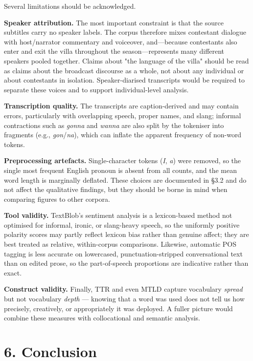 \documentclass[11pt]{article}
\begin{document}
Several limitations should be acknowledged.

\textbf{Speaker attribution.} The most important constraint is that the source subtitles carry no speaker labels. The corpus therefore mixes contestant dialogue with host/narrator commentary and voiceover, and---because contestants also enter and exit the villa throughout the season---represents many different speakers pooled together. Claims about "the language of the villa" should be read as claims about the broadcast discourse as a whole, not about any individual or about contestants in isolation. Speaker-diarised transcripts would be required to separate these voices and to support individual-level analysis.

\textbf{Transcription quality.} The transcripts are caption-derived and may contain errors, particularly with overlapping speech, proper names, and slang; informal contractions such as \emph{gonna} and \emph{wanna} are also split by the tokeniser into fragments (e.g., \emph{gon}/\emph{na}), which can inflate the apparent frequency of non-word tokens.

\textbf{Preprocessing artefacts.} Single-character tokens (\emph{I}, \emph{a}) were removed, so the single most frequent English pronoun is absent from all counts, and the mean word length is marginally deflated. These choices are documented in §3.2 and do not affect the qualitative findings, but they should be borne in mind when comparing figures to other corpora.

\textbf{Tool validity.} TextBlob's sentiment analysis is a lexicon-based method not optimised for informal, ironic, or slang-heavy speech, so the uniformly positive polarity scores may partly reflect lexicon bias rather than genuine affect; they are best treated as relative, within-corpus comparisons. Likewise, automatic POS tagging is less accurate on lowercased, punctuation-stripped conversational text than on edited prose, so the part-of-speech proportions are indicative rather than exact.

\textbf{Construct validity.} Finally, TTR and even MTLD capture vocabulary \emph{spread} but not vocabulary \emph{depth} --- knowing that a word was used does not tell us how precisely, creatively, or appropriately it was deployed. A fuller picture would combine these measures with collocational and semantic analysis.


\section*{6. Conclusion}
\end{document}
